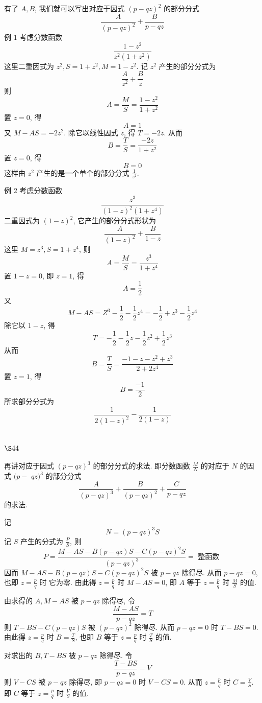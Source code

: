有了 $A, B$, 我们就可以写出对应于因式 $(p-q z)^{2}$ 的部分分式
\[
\frac{A}{(p-q z)^{2}}+\frac{B}{p-q z}
\]
例 1 考虑分数函数
\[
\frac{1-z^{2}}{z^{2}\left(1+z^{2}\right)}
\]
这里二重因式为 $z^{2}, S=1+z^{2}, M=1-z^{2}$. 记 $z^{2}$ 产生的部分分式为
\[
\frac{A}{z^{2}}+\frac{B}{z}
\]
则 
\[
A=\frac{M}{S}=\frac{1-z^{2}}{1+z^{2}}
\]
置 $z=0$, 得
\[
A=1
\]
又 $M-A S=-2 z^{2}$. 除它以线性因式 $z$, 得 $T=-2 z$. 从而
\[
B=\frac{T}{S}=\frac{-2 z}{1+z^{2}}
\]
置 $z=0$, 得
\[
B=0
\]
这样由 $z^{2}$ 产生的是一个单个的部分分式 $\frac{1}{z^{2}}$.

例 2 考虑分数函数
\[
\frac{z^{3}}{(1-z)^{2}\left(1+z^{4}\right)}
\]
二重因式为 $(1-z)^{2}$, 它产生的部分分式形状为
\[
\frac{A}{(1-z)^{2}}+\frac{B}{1-z}
\]
这里 $M=z^{3}, S=1+z^{4}$, 则
\[
A=\frac{M}{S}=\frac{z^{3}}{1+z^{4}}
\]
置 $1-z=0$, 即 $z=1$, 得
\[
A=\frac{1}{2}
\]
又
\[
M-A S=Z^{3}-\frac{1}{2}-\frac{1}{2} z^{4}=-\frac{1}{2}+z^{3}-\frac{1}{2} z^{4}
\]
除它以 $1-z$, 得
\[
T=-\frac{1}{2}-\frac{1}{2} z-\frac{1}{2} z^{2}+\frac{1}{2} z^{3}
\]
从而
\[
B=\frac{T}{S}=\frac{-1-z-z^{2}+z^{3}}{2+2 z^{4}}
\]
置 $z=1$, 得
\[
B=\frac{-1}{2}
\]
所求部分分式为
\[
\frac{1}{2(1-z)^{2}}-\frac{1}{2(1-z)}
\]
\section{$\S 44$}

再讲对应于因式 $(p-q z)^{3}$ 的部分分式的求法. 即分数函数 $\frac{M}{N}$ 的对应于 $N$ 的因式 $(p-$ $q z)^{3}$ 的部分分式
\[
\frac{A}{(p-q z)^{3}}+\frac{B}{(p-q z)^{2}}+\frac{C}{p-q z}
\]
的求法.

记
\[
N=(p-q z)^{3} S
\]
记 $S$ 产生的分式为 $\frac{P}{S}$, 则
\[
P=\frac{M-A S-B(p-q z) S-C(p-q z)^{2} S}{(p-q z)^{3}}=\text { 整函数 }
\]
因而 $M-A S-B(p-q z) S-C(p-q z)^{2} S$ 被 $p-q z$ 除得尽. 从而 $p-q z=0$, 也即 $z=\frac{p}{q}$ 时 它为零. 由此得 $z=\frac{p}{q}$ 时 $M-A S=0$, 即 $A$ 等于 $z=\frac{p}{q}$ 时 $\frac{M}{S}$ 的值.

由求得的 $A, M-A S$ 被 $p-q z$ 除得尽, 令
\[
\frac{M-A S}{p-q z}=T
\]
则 $T-B S-C(p-q z) S$ 被 $(p-q z)^{2}$ 除得尽. 从而 $p-q z=0$ 时 $T-B S=0$. 由此得 $z=\frac{p}{q}$ 时 $B=\frac{T}{S}$, 也即 $B$ 等于 $z=\frac{p}{q}$ 时 $\frac{T}{S}$ 的值.

对求出的 $B, T-B S$ 被 $p-q z$ 除得尽. 令
\[
\frac{T-B S}{p-q z}=V
\]
则 $V-C S$ 被 $p-q z$ 除得尽, 即 $p-q z=0$ 时 $V-C S=0$. 从而 $z=\frac{p}{q}$ 时 $C=\frac{V}{S}$. 即 $C$ 等于 $z=\frac{p}{q}$ 时 $\frac{V}{S}$ 的值.

